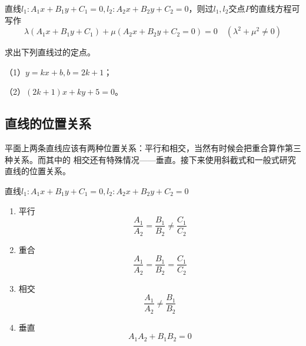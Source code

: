 \begin{theorem}
    直线\(l_1:A_1x+B_1y+C_1=0,l_2:A_2x+B_2y+C_2=0\)，则过\(l_1,l_2\)交点\(P\)的直线方程可写作
    \begin{equation}
        \lambda(A_1x+B_1y+C_1)+\mu(A_2x+B_2y+C_2=0)=0\quad (\lambda^2+\mu^2\neq 0)
    \end{equation}
\end{theorem}

\begin{example} 求出下列直线过的定点。

    （1）\(y=kx+b, b=2k+1\)；
    
    （2）\((2k+1)x+ky+5=0\)。
\end{example}
\clearpage
\subsection{直线的位置关系}
平面上两条直线应该有两种位置关系：平行和相交，当然有时候会把重合算作第三种关系。而其中的
相交还有特殊情况——垂直。接下来使用斜截式和一般式研究直线的位置关系。
\begin{theorem}
    直线\(l_1:A_1x+B_1y+C_1=0,l_2:A_2x+B_2y+C_2=0\)
\begin{enumerate}
    \item 平行
    \begin{equation}
        \frac{A_1}{A_2}=\frac{B_1}{B_2}\neq \frac{C_1}{C_2}
    \end{equation}
    \item 重合
    \begin{equation}
        \frac{A_1}{A_2}=\frac{B_1}{B_2}=\frac{C_1}{C_2}
    \end{equation}
    \item 相交
    \begin{equation}
        \frac{A_1}{A_2}\neq \frac{B_1}{B_2}
    \end{equation}
    \item 垂直
    \begin{equation}
        A_1A_2+B_1B_2=0
    \end{equation}
\end{enumerate}
\end{theorem}



